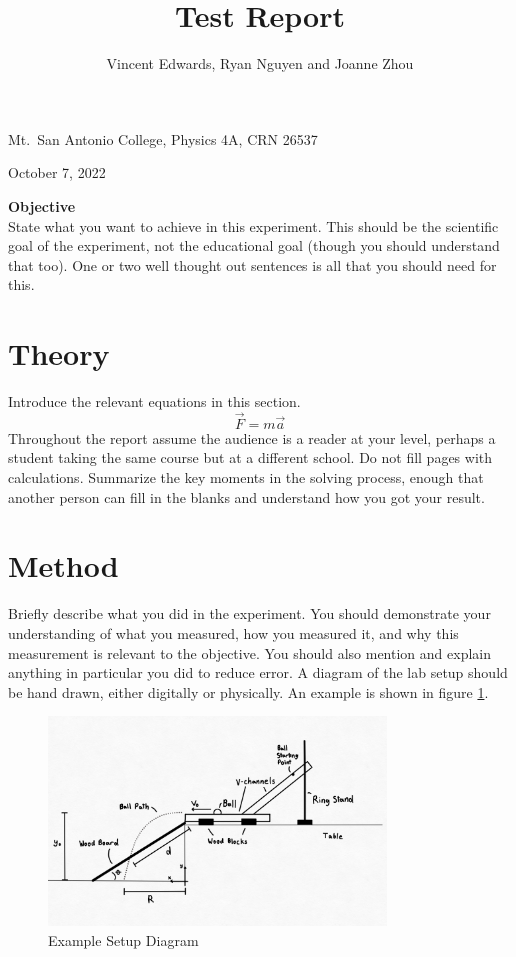 \documentclass[12pt]{iopart} %
\begin{document}
\title{Test Report}

\author{Vincent Edwards, Ryan Nguyen and Joanne Zhou}

\vspace{10pt}
\begin{indented}
  \item[]Mt.~San Antonio College, Physics 4A, CRN 26537
  \item[]October 7, 2022
  \vspace{10pt}
  \item[]\textbf{Objective}\\
    State what you want to achieve in this experiment.
    This should be the scientific goal of the experiment, not the educational goal (though you should understand that too).
    One or two well thought out sentences is all that you should need for this.
\end{indented}

\section{Theory}
Introduce the relevant equations in this section.
\begin{equation}
  \vec F = m \vec a \label{eq:n2l}
\end{equation}
Throughout the report assume the audience is a reader at your level, perhaps a student taking the same course but at a different school.
Do not fill pages with calculations.
Summarize the key moments in the solving process, enough that another person can fill in the blanks and understand how you got your result.

\section{Method}

Briefly describe what you did in the experiment.
You should demonstrate your understanding of what you measured, how you measured it, and why this measurement is relevant to the objective.
You should also mention and explain anything in particular you did to reduce error.
A diagram of the lab setup should be hand drawn, either digitally or physically.
An example is shown in figure \ref{fig:exampleSetupDiagram}.

\begin{figure}
  \centering
  \includegraphics[width=0.8\textwidth]{example-setup-diagram.png}
  \caption{\label{fig:exampleSetupDiagram}Example Setup Diagram}
\end{figure}
\end{document}
